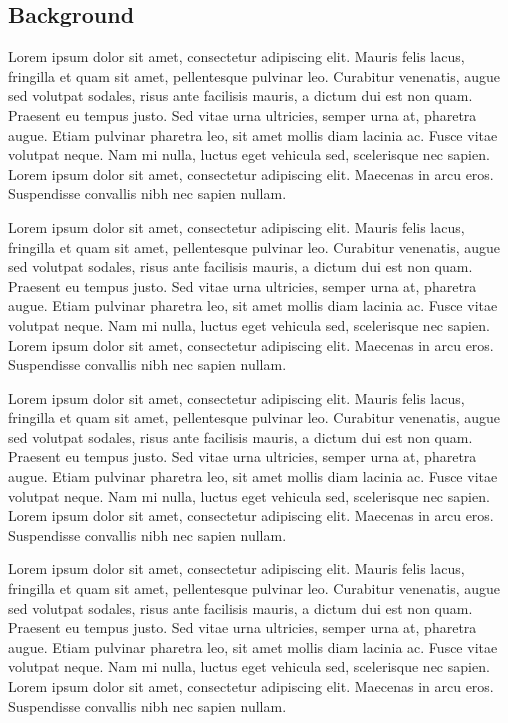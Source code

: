 \documentclass[draftclsnofoot,onecolumn]{IEEEtran}
\begin{document}
\subsection{Background}
Lorem ipsum dolor sit amet, consectetur adipiscing elit. Mauris felis lacus, fringilla et quam sit amet, pellentesque pulvinar leo. Curabitur venenatis, augue sed volutpat sodales, risus ante facilisis mauris, a dictum dui est non quam. Praesent eu tempus justo. Sed vitae urna ultricies, semper urna at, pharetra augue. Etiam pulvinar pharetra leo, sit amet mollis diam lacinia ac. Fusce vitae volutpat neque. Nam mi nulla, luctus eget vehicula sed, scelerisque nec sapien. Lorem ipsum dolor sit amet, consectetur adipiscing elit. Maecenas in arcu eros. Suspendisse convallis nibh nec sapien nullam.

Lorem ipsum dolor sit amet, consectetur adipiscing elit. Mauris felis lacus, fringilla et quam sit amet, pellentesque pulvinar leo. Curabitur venenatis, augue sed volutpat sodales, risus ante facilisis mauris, a dictum dui est non quam. Praesent eu tempus justo. Sed vitae urna ultricies, semper urna at, pharetra augue. Etiam pulvinar pharetra leo, sit amet mollis diam lacinia ac. Fusce vitae volutpat neque. Nam mi nulla, luctus eget vehicula sed, scelerisque nec sapien. Lorem ipsum dolor sit amet, consectetur adipiscing elit. Maecenas in arcu eros. Suspendisse convallis nibh nec sapien nullam.

Lorem ipsum dolor sit amet, consectetur adipiscing elit. Mauris felis lacus, fringilla et quam sit amet, pellentesque pulvinar leo. Curabitur venenatis, augue sed volutpat sodales, risus ante facilisis mauris, a dictum dui est non quam. Praesent eu tempus justo. Sed vitae urna ultricies, semper urna at, pharetra augue. Etiam pulvinar pharetra leo, sit amet mollis diam lacinia ac. Fusce vitae volutpat neque. Nam mi nulla, luctus eget vehicula sed, scelerisque nec sapien. Lorem ipsum dolor sit amet, consectetur adipiscing elit. Maecenas in arcu eros. Suspendisse convallis nibh nec sapien nullam.

Lorem ipsum dolor sit amet, consectetur adipiscing elit. Mauris felis lacus, fringilla et quam sit amet, pellentesque pulvinar leo. Curabitur venenatis, augue sed volutpat sodales, risus ante facilisis mauris, a dictum dui est non quam. Praesent eu tempus justo. Sed vitae urna ultricies, semper urna at, pharetra augue. Etiam pulvinar pharetra leo, sit amet mollis diam lacinia ac. Fusce vitae volutpat neque. Nam mi nulla, luctus eget vehicula sed, scelerisque nec sapien. Lorem ipsum dolor sit amet, consectetur adipiscing elit. Maecenas in arcu eros. Suspendisse convallis nibh nec sapien nullam.
\end{document}
